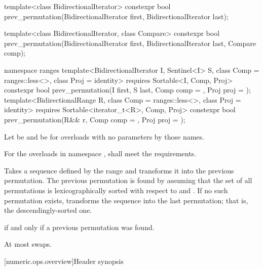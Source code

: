 %
\begin{itemdecl}
template<class BidirectionalIterator>
  constexpr bool prev_permutation(BidirectionalIterator first,
                                  BidirectionalIterator last);

template<class BidirectionalIterator, class Compare>
  constexpr bool prev_permutation(BidirectionalIterator first,
                                  BidirectionalIterator last, Compare comp);

namespace ranges {
  template<BidirectionalIterator I, Sentinel<I> S, class Comp = ranges::less<>,
      class Proj = identity>
    requires Sortable<I, Comp, Proj>
    constexpr bool
      prev_permutation(I first, S last, Comp comp = {}, Proj proj = {});
  template<BidirectionalRange R, class Comp = ranges::less<>,
      class Proj = identity>
    requires Sortable<iterator_t<R>, Comp, Proj>
    constexpr bool
      prev_permutation(R&& r, Comp comp = {}, Proj proj = {});
}
\end{itemdecl}

\begin{itemdescr}
\pnum
Let  be 
and  be 
for overloads with no parameters by those names.

\pnum
\requires
For the overloads in namespace ,
 shall meet the
 requirements.

\pnum
\effects
Takes a sequence defined by the range
and transforms it into the previous permutation.
The previous permutation is found by assuming that the set of all permutations is
lexicographically sorted with respect to  and .
If no such permutation exists,
transforms the sequence into the last permutation;
that is, the descendingly-sorted one.

\pnum
\returns
{} if and only if a previous permutation was found.

\pnum
\complexity
At most
swaps.
\end{itemdescr}

[numeric.ops.overview]{Header  synopsis}

